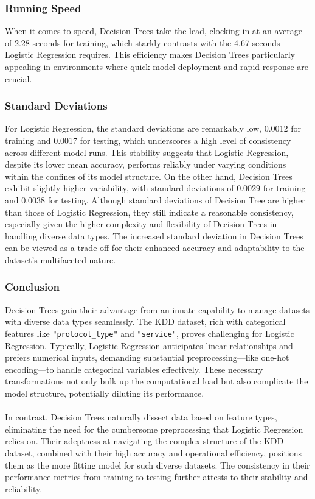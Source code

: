 \documentclass[12pt, letterpaper]{article}
\begin{document}
\subsubsection{Running Speed}

When it comes to speed, Decision Trees take the lead, clocking in at an average of 2.28 seconds for training, which starkly contrasts with the 4.67 seconds Logistic Regression requires. This efficiency makes Decision Trees particularly appealing in environments where quick model deployment and rapid response are crucial.

\subsubsection{Standard Deviations}
For Logistic Regression, the standard deviations are remarkably low, 0.0012 for training and 0.0017 for testing, which underscores a high level of consistency across different model runs. This stability suggests that Logistic Regression, despite its lower mean accuracy, performs reliably under varying conditions within the confines of its model structure. On the other hand, Decision Trees exhibit slightly higher variability, with standard deviations of 0.0029 for training and 0.0038 for testing. Although standard deviations of Decision Tree are higher than those of Logistic Regression, they still indicate a reasonable consistency, especially given the higher complexity and flexibility of Decision Trees in handling diverse data types. The increased standard deviation in Decision Trees can be viewed as a trade-off for their enhanced accuracy and adaptability to the dataset’s multifaceted nature.

\subsubsection{Conclusion}
Decision Trees gain their advantage from an innate capability to manage datasets with diverse data types seamlessly. The KDD dataset, rich with categorical features like \verb|"protocol_type"| and \verb|"service"|, proves challenging for Logistic Regression. Typically, Logistic Regression anticipates linear relationships and prefers numerical inputs, demanding substantial preprocessing—like one-hot encoding—to handle categorical variables effectively. These necessary transformations not only bulk up the computational load but also complicate the model structure, potentially diluting its performance.
\\\\
In contrast, Decision Trees naturally dissect data based on feature types, eliminating the need for the cumbersome preprocessing that Logistic Regression relies on. Their adeptness at navigating the complex structure of the KDD dataset, combined with their high accuracy and operational efficiency, positions them as the more fitting model for such diverse datasets. The consistency in their performance metrics from training to testing further attests to their stability and reliability.


 

\end{document}

